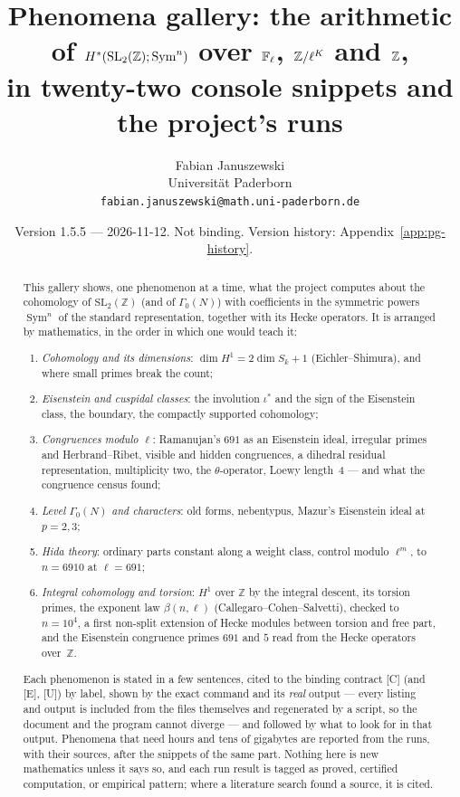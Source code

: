 \documentclass[11pt]{article}
\title{Phenomena gallery: the arithmetic of $H^{*}(\SL_2(\Z);\Sym^{n})$ over $\mathbb{F}_\ell$, $\Z/\ell^{K}$ and $\Z$,\\ in twenty-two console snippets and the project's runs}
\author{Fabian Januszewski\\ Universit\"at Paderborn\\ \texttt{fabian.januszewski@math.uni-paderborn.de}}
\date{Version 1.5.5 --- 2026-11-12. Not binding. Version history: Appendix~\ref{app:pg-history}.}
\newcommand{\Z}{\mathbb{Z}}
\newcommand{\Sym}{\operatorname{Sym}}
\newcommand{\SL}{\mathrm{SL}}
\newcommand{\Ga}{\Gamma}
\begin{document}
\maketitle

\begin{abstract}
This gallery shows, one phenomenon at a time, what the project computes about the cohomology of $\SL_2(\Z)$ (and of $\Ga_0(N)$) with
coefficients in the symmetric powers $\Sym^{n}$ of the standard representation, together with its Hecke operators. It is arranged by
mathematics, in the order in which one would teach it:
\begin{enumerate}[label=\Roman*.,leftmargin=2.2em,itemsep=1pt]
\item \emph{Cohomology and its dimensions}: $\dim H^{1}=2\dim S_k+1$ (Eichler--Shimura), and where small primes break the count;
\item \emph{Eisenstein and cuspidal classes}: the involution $\iota^{*}$ and the sign of the Eisenstein class, the boundary, the compactly
  supported cohomology;
\item \emph{Congruences modulo $\ell$}: Ramanujan's $691$ as an Eisenstein ideal, irregular primes and Herbrand--Ribet, visible and hidden
  congruences, a dihedral residual representation, multiplicity two, the $\theta$-operator, Loewy length~$4$ --- and what the congruence census found;
\item \emph{Level $\Ga_0(N)$ and characters}: old forms, nebentypus, Mazur's Eisenstein ideal at $p=2,3$;
\item \emph{Hida theory}: ordinary parts constant along a weight class, control modulo $\ell^{m}$, to $n=6910$ at $\ell=691$;
\item \emph{Integral cohomology and torsion}: $H^{1}$ over $\Z$ by the integral descent, its torsion primes, the exponent law $\beta(n,\ell)$
  (Callegaro--Cohen--Salvetti), checked to $n=10^{4}$, a first non-split extension of Hecke modules between torsion and free part, and the Eisenstein congruence primes $691$ and $5$ read from the Hecke operators
  over~$\Z$.
\end{enumerate}
Each phenomenon is stated in a few sentences, cited to the binding contract [C] (and [E], [U]) by label, shown by the exact command and its
\emph{real} output --- every listing and output is included from the files themselves and regenerated by a script, so the document and the
program cannot diverge --- and followed by what to look for in that output. Phenomena that need hours and tens of gigabytes are reported from
the runs, with their sources, after the snippets of the same part. Nothing here is new mathematics unless it says so, and each run result is
tagged as proved, certified computation, or empirical pattern; where a literature search found a source, it is cited.
\end{abstract}
\end{document}
